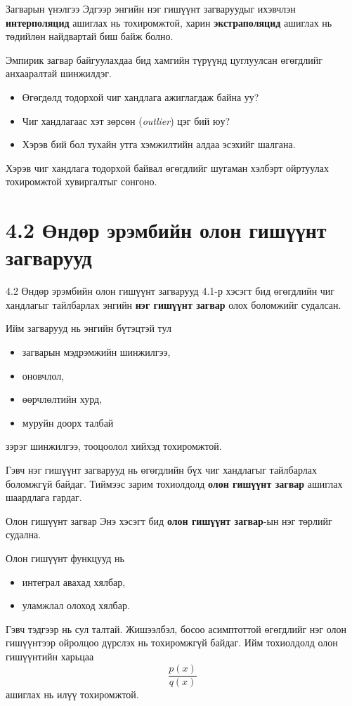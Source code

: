 \documentclass[dvipsnames]{beamer}
\begin{document}
\begin{frame}{Загварын үнэлгээ}
\footnotesize
Эдгээр энгийн нэг гишүүнт загваруудыг ихэвчлэн \textbf{интерполяцид}
ашиглах нь тохиромжтой, харин \textbf{экстраполяцид} ашиглах нь
төдийлөн найдвартай биш байж болно.

\medskip
Эмпирик загвар байгуулахдаа бид хамгийн түрүүнд цуглуулсан өгөгдлийг
анхааралтай шинжилдэг.

\begin{itemize}
\item Өгөгдөлд тодорхой чиг хандлага ажиглагдаж байна уу?
\item Чиг хандлагаас хэт зөрсөн (\emph{outlier}) цэг бий юу?
\item Хэрэв бий бол тухайн утга хэмжилтийн алдаа эсэхийг шалгана.
\end{itemize}

Хэрэв чиг хандлага тодорхой байвал өгөгдлийг шугаман хэлбэрт
ойртуулах тохиромжтой хувиргалтыг сонгоно.
\end{frame}

\section{4.2 Өндөр эрэмбийн олон гишүүнт загварууд}

\begin{frame}{4.2 Өндөр эрэмбийн олон гишүүнт загварууд}
\small
4.1-р хэсэгт бид өгөгдлийн чиг хандлагыг тайлбарлах энгийн
\textbf{нэг гишүүнт загвар} олох боломжийг судалсан.

\medskip
Ийм загварууд нь энгийн бүтэцтэй тул
\begin{itemize}
\item загварын мэдрэмжийн шинжилгээ,
\item оновчлол,
\item өөрчлөлтийн хурд,
\item муруйн доорх талбай
\end{itemize}
зэрэг шинжилгээ, тооцоолол хийхэд тохиромжтой.

\medskip
Гэвч нэг гишүүнт загварууд нь өгөгдлийн бүх чиг хандлагыг тайлбарлах
боломжгүй байдаг. Тиймээс зарим тохиолдолд \textbf{олон гишүүнт
загвар} ашиглах шаардлага гардаг.
\end{frame}

\begin{frame}{Олон гишүүнт загвар}
\small
Энэ хэсэгт бид \textbf{олон гишүүнт загвар}-ын нэг төрлийг судална.

\medskip
Олон гишүүнт функцууд нь
\begin{itemize}
\item интеграл авахад хялбар,
\item уламжлал олоход хялбар.
\end{itemize}

\medskip
Гэвч тэдгээр нь сул талтай. Жишээлбэл, босоо асимптоттой өгөгдлийг нэг
олон гишүүнтээр ойролцоо дүрслэх нь тохиромжгүй байдаг. Ийм тохиолдолд
олон гишүүнтийн харьцаа
\[
\frac{p(x)}{q(x)}
\]
ашиглах нь илүү тохиромжтой.
\end{frame}
\end{document}
